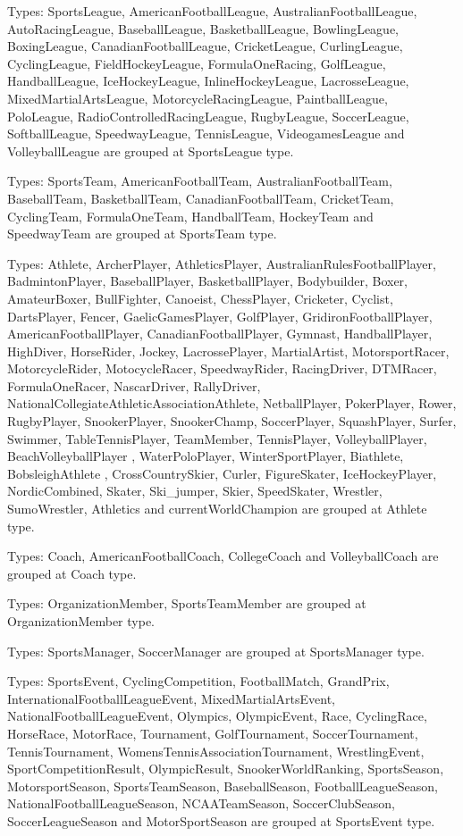 \documentclass[thesis=M,english]{FITthesis}[2018/05/30]
\begin{document}
Types: SportsLeague, AmericanFootballLeague, AustralianFootballLeague, AutoRacingLeague, BaseballLeague, BasketballLeague, BowlingLeague, BoxingLeague, CanadianFootballLeague, CricketLeague, CurlingLeague, CyclingLeague, FieldHockeyLeague, FormulaOneRacing, GolfLeague, HandballLeague, IceHockeyLeague, InlineHockeyLeague, LacrosseLeague, MixedMartialArtsLeague, MotorcycleRacingLeague, PaintballLeague, PoloLeague, RadioControlledRacingLeague, RugbyLeague, SoccerLeague, SoftballLeague, SpeedwayLeague, TennisLeague, VideogamesLeague and VolleyballLeague are grouped at SportsLeague type.

Types: SportsTeam, AmericanFootballTeam, AustralianFootballTeam, BaseballTeam, BasketballTeam, CanadianFootballTeam, CricketTeam, CyclingTeam, FormulaOneTeam, HandballTeam, HockeyTeam and SpeedwayTeam are grouped at SportsTeam type.

Types: Athlete, ArcherPlayer, AthleticsPlayer, AustralianRulesFootballPlayer, BadmintonPlayer, BaseballPlayer, BasketballPlayer, Bodybuilder, Boxer, AmateurBoxer, BullFighter, Canoeist, ChessPlayer, Cricketer, Cyclist, DartsPlayer, Fencer, GaelicGamesPlayer, GolfPlayer, GridironFootballPlayer, AmericanFootballPlayer, CanadianFootballPlayer, Gymnast, HandballPlayer, HighDiver, HorseRider, Jockey, LacrossePlayer, MartialArtist, MotorsportRacer, MotorcycleRider, MotocycleRacer, SpeedwayRider, RacingDriver, DTMRacer, FormulaOneRacer, NascarDriver, RallyDriver, NationalCollegiateAthleticAssociationAthlete, NetballPlayer, PokerPlayer, Rower, RugbyPlayer, SnookerPlayer, SnookerChamp, SoccerPlayer, SquashPlayer, Surfer, Swimmer, TableTennisPlayer, TeamMember, TennisPlayer, VolleyballPlayer, BeachVolleyballPlayer , WaterPoloPlayer, WinterSportPlayer, Biathlete, BobsleighAthlete , CrossCountrySkier, Curler, FigureSkater, IceHockeyPlayer, NordicCombined, Skater, Ski\_jumper, Skier, SpeedSkater, Wrestler, SumoWrestler, Athletics and currentWorldChampion are grouped at Athlete type.

Types: Coach, AmericanFootballCoach, CollegeCoach and VolleyballCoach are grouped at Coach type.

Types: OrganizationMember, SportsTeamMember are grouped at OrganizationMember type.

Types: SportsManager, SoccerManager are grouped at SportsManager type.

Types: SportsEvent, CyclingCompetition, FootballMatch, GrandPrix, InternationalFootballLeagueEvent, MixedMartialArtsEvent, NationalFootballLeagueEvent, Olympics, OlympicEvent, Race, CyclingRace, HorseRace, MotorRace, Tournament, GolfTournament, SoccerTournament, TennisTournament, WomensTennisAssociationTournament, WrestlingEvent, SportCompetitionResult, OlympicResult, SnookerWorldRanking, SportsSeason, MotorsportSeason, SportsTeamSeason, BaseballSeason, FootballLeagueSeason, NationalFootballLeagueSeason, NCAATeamSeason, SoccerClubSeason, SoccerLeagueSeason and MotorSportSeason are grouped at SportsEvent type. 
\end{document}
